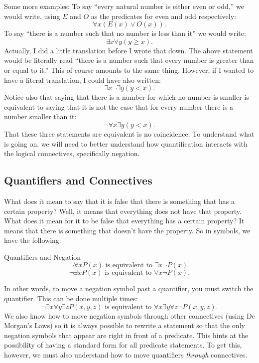 \documentclass[12pt]{article}
\begin{document}
Some more examples: To say ``every natural number is either even or odd,'' we would write, using $E$ and $O$ as the predicates for even and odd respectively:
\[\forall x (E(x) \vee O(x)).\]
To say ``there is a number such that no number is less than it'' we would write:
\[ \exists x \forall y (y \ge x).\]
Actually, I did a little translation before I wrote that down.  The above statement would be literally read ``there is a number such that every number is greater than or equal to it.''  This of course amounts to the same thing.  However, if I wanted to have a literal translation, I could have also written:
\[ \exists x \neg \exists y (y < x).\]
Notice also that saying that there is a number for which no number is smaller is equivalent to saying that it is not the case that for every number there is a number smaller than it:
\[\neg \forall x \exists y (y < x).\]
That these three statements are equivalent is no coincidence.  To understand what is going on, we will need to better understand how quantification interacts with the logical connectives, specifically negation.

\subsection{Quantifiers and Connectives}

What does it mean to say that it is false that there is something that has a certain property?  Well, it means that everything does not have that property.  What does it mean for it to be false that everything has a certain property?  It means that there is something that doesn't have the property.  So in symbols, we have the following:

\begin{defbox}{Quantifiers and Negation}
\[\neg \forall x P(x) \mbox{ is equivalent to } \exists x \neg P(x).\]
\[\neg \exists x P(x)\mbox{ is equivalent to } \forall x \neg P(x).\]
\end{defbox}

In other words, to move a negation symbol past a quantifier, you must switch the quantifier. This can be done multiple times:
\[\neg \exists x \forall y \exists z P(x,y,z) \mbox{ is equivalent to } \forall x \exists y \forall z \neg P(x,y,z).\]
We also know how to move negation symbols through other connectives (using De Morgan's Laws) so it is always possible to rewrite a statement so that the only negation symbols that appear are right in front of a predicate.  This hints at the possibility of having a standard form for all predicate statements.  To get this, however, we must also understand how to move quantifiers \emph{through} connectives.
\end{document}
